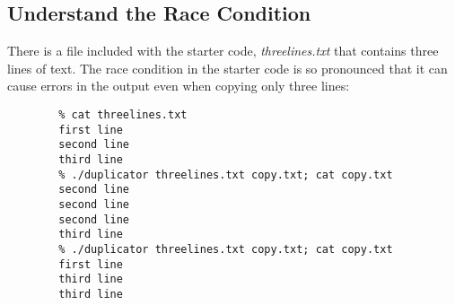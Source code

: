     \subsection{Understand the Race Condition} \label{subsec:understandRace}

    There is a file included with the starter code, \textit{threelines.txt} that contains three lines of text.
    The race condition in the starter code is so pronounced that it can cause errors in the output even when copying only three lines:

    \begin{verbatim}
        % cat threelines.txt
        first line
        second line
        third line
        % ./duplicator threelines.txt copy.txt; cat copy.txt
        second line
        second line
        second line
        third line
        % ./duplicator threelines.txt copy.txt; cat copy.txt
        first line
        third line
        third line
    \end{verbatim}

